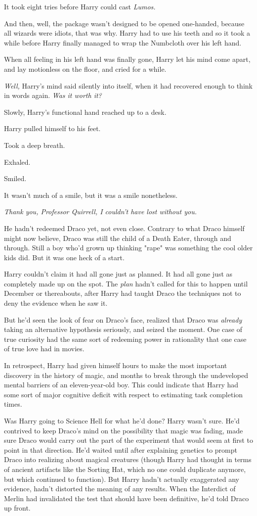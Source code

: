 It took eight tries before Harry could cast \emph{Lumos.}

And then, well, the package wasn't designed to be opened one-handed, because
all wizards were idiots, that was why. Harry had to use his teeth and so it
took a while before Harry finally managed to wrap the Numbcloth over his left
hand.

When all feeling in his left hand was finally gone, Harry let his mind come
apart, and lay motionless on the floor, and cried for a while.

\emph{Well,} Harry's mind said silently into itself, when it had recovered
enough to think in words again. \emph{Was it worth it?}

Slowly, Harry's functional hand reached up to a desk.

Harry pulled himself to his feet.

Took a deep breath.

Exhaled.

Smiled.

It wasn't much of a smile, but it was a smile nonetheless.

\emph{Thank you, Professor Quirrell, I couldn't have lost without you.}

He hadn't redeemed Draco yet, not even close. Contrary to what Draco himself
might now believe, Draco was still the child of a Death Eater, through and
through. Still a boy who'd grown up thinking "rape" was something the cool
older kids did. But it was one heck of a start.

Harry couldn't claim it had all gone just as planned. It had all gone just as
completely made up on the spot. The \emph{plan} hadn't called for this to
happen until December or thereabouts, after Harry had taught Draco the
techniques not to deny the evidence when he saw it.

But he'd seen the look of fear on Draco's face, realized that Draco was
\emph{already} taking an alternative hypothesis seriously, and seized the
moment. One case of true curiosity had the same sort of redeeming power in
rationality that one case of true love had in movies.

In retrospect, Harry had given himself hours to make the most important
discovery in the history of magic, and months to break through the undeveloped
mental barriers of an eleven-year-old boy. This could indicate that Harry had
some sort of major cognitive deficit with respect to estimating task completion
times.

Was Harry going to Science Hell for what he'd done? Harry wasn't sure. He'd
contrived to keep Draco's mind on the possibility that magic was fading, made
sure Draco would carry out the part of the experiment that would seem at first
to point in that direction. He'd waited until after explaining genetics to
prompt Draco into realizing about magical creatures (though Harry had thought
in terms of ancient artifacts like the Sorting Hat, which no one could
duplicate anymore, but which continued to function). But Harry hadn't actually
exaggerated any evidence, hadn't distorted the meaning of any results. When the
Interdict of Merlin had invalidated the test that should have been definitive,
he'd told Draco up front.

